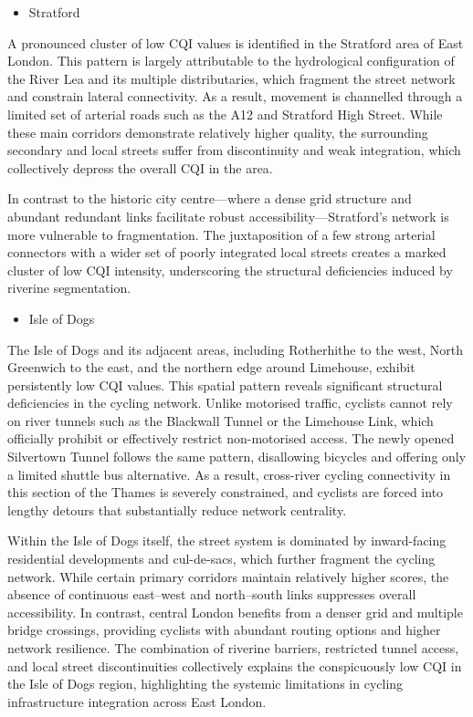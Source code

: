 \documentclass[
  12pt,
  oneside]{book}
\providecommand{\tightlist}{%
  \setlength{\itemsep}{0pt}\setlength{\parskip}{0pt}}
\begin{document}
\begin{itemize}
\tightlist
\item
  Stratford
\end{itemize}

A pronounced cluster of low CQI values is identified in the Stratford area of East London. This pattern is largely attributable to the hydrological configuration of the River Lea and its multiple distributaries, which fragment the street network and constrain lateral connectivity. As a result, movement is channelled through a limited set of arterial roads such as the A12 and Stratford High Street. While these main corridors demonstrate relatively higher quality, the surrounding secondary and local streets suffer from discontinuity and weak integration, which collectively depress the overall CQI in the area.

In contrast to the historic city centre---where a dense grid structure and abundant redundant links facilitate robust accessibility---Stratford's network is more vulnerable to fragmentation. The juxtaposition of a few strong arterial connectors with a wider set of poorly integrated local streets creates a marked cluster of low CQI intensity, underscoring the structural deficiencies induced by riverine segmentation.

\begin{itemize}
\tightlist
\item
  Isle of Dogs
\end{itemize}

The Isle of Dogs and its adjacent areas, including Rotherhithe to the west, North Greenwich to the east, and the northern edge around Limehouse, exhibit persistently low CQI values. This spatial pattern reveals significant structural deficiencies in the cycling network. Unlike motorised traffic, cyclists cannot rely on river tunnels such as the Blackwall Tunnel or the Limehouse Link, which officially prohibit or effectively restrict non-motorised access. The newly opened Silvertown Tunnel follows the same pattern, disallowing bicycles and offering only a limited shuttle bus alternative. As a result, cross-river cycling connectivity in this section of the Thames is severely constrained, and cyclists are forced into lengthy detours that substantially reduce network centrality.

Within the Isle of Dogs itself, the street system is dominated by inward-facing residential developments and cul-de-sacs, which further fragment the cycling network. While certain primary corridors maintain relatively higher scores, the absence of continuous east--west and north--south links suppresses overall accessibility. In contrast, central London benefits from a denser grid and multiple bridge crossings, providing cyclists with abundant routing options and higher network resilience. The combination of riverine barriers, restricted tunnel access, and local street discontinuities collectively explains the conspicuously low CQI in the Isle of Dogs region, highlighting the systemic limitations in cycling infrastructure integration across East London.
\end{document}
